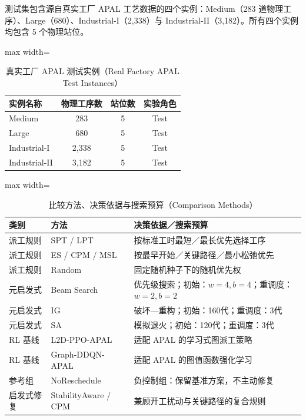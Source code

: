 \documentclass[journal,10pt]{IEEEtran}
\renewcommand{\arraystretch}{1.04}
\begin{document}
测试集包含源自真实工厂 APAL 工艺数据的四个实例：Medium（283 道物理工序）、Large（680）、Industrial-I（2,338）与 Industrial-II（3,182）。所有四个实例均包含 5 个物理站位。

\begin{table}[!t]
\centering
\caption{真实工厂 APAL 测试实例（Real Factory APAL Test Instances）}
\label{tab:instances}
\setlength{\tabcolsep}{8pt}
\renewcommand{\arraystretch}{1.02}
\begin{adjustbox}{max width=\columnwidth}
\begin{tabular}{@{}lccc@{}}
\toprule
\textbf{实例名称} & \textbf{物理工序数} & \textbf{站位数} & \textbf{实验角色} \\
\midrule
Medium & 283 & 5 & Test \\
Large & 680 & 5 & Test \\
Industrial-I & 2,338 & 5 & Test \\
Industrial-II & 3,182 & 5 & Test \\
\bottomrule
\end{tabular}
\end{adjustbox}
\vspace{2pt}
\par{}\par
\end{table}

\begin{table}[!t]
\centering
\caption{比较方法、决策依据与搜索预算（Comparison Methods）}
\label{tab:baselines}
\setlength{\tabcolsep}{3pt}
\renewcommand{\arraystretch}{0.98}
\begin{adjustbox}{max width=\columnwidth}
\begin{tabular}{@{}lll@{}}
\toprule
\textbf{类别} & \textbf{方法} & \textbf{决策依据／搜索预算} \\
\midrule
派工规则 & SPT\cite{smith1956} / LPT & 按标准工时最短／最长优先选择工序 \\
派工规则 & ES / CPM\cite{kelley1961} / MSL & 按最早开始／关键路径／最小松弛优先 \\
派工规则 & Random & 固定随机种子下的随机优先权 \\
元启发式 & Beam Search\cite{ow1988} & 优先级搜索；初始：$w=4, b=4$；重调度：$w=2, b=2$ \\
元启发式 & IG\cite{ruiz2007} & 破坏---重构；初始：160代；重调度：3代 \\
元启发式 & SA\cite{kirkpatrick1983} & 模拟退火；初始：120代；重调度：3代 \\
RL 基线 & L2D-PPO-APAL & 适配 APAL 的学习式图派工策略 \\
RL 基线 & Graph-DDQN-APAL & 适配 APAL 的图值函数强化学习 \\
参考组 & NoReschedule & 负控制组：保留基准方案，不主动修复 \\
启发式修复 & StabilityAware / CPM & 兼顾开工扰动与关键路径的复合规则 \\
\bottomrule
\end{tabular}
\end{adjustbox}
\end{table}
\end{document}
